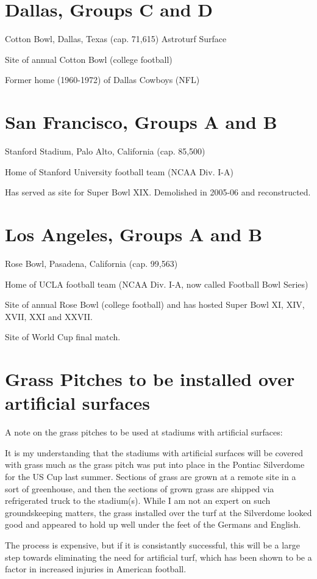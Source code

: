 \section{Dallas, Groups C and D}
Cotton Bowl, Dallas, Texas (cap. 71,615) Astroturf Surface

Site of annual Cotton Bowl (college football)

Former home (1960-1972) of Dallas Cowboys (NFL)
\section{San Francisco, Groups A and B} 
Stanford Stadium, Palo Alto, California (cap. 85,500)

Home of Stanford University football team (NCAA Div. I-A)
 
Has served as site for Super Bowl XIX.  Demolished in 2005-06 and reconstructed.
\section{Los Angeles, Groups A and B} 
Rose Bowl, Pasadena, California (cap. 99,563)

Home of UCLA football team (NCAA Div. I-A, now called Football Bowl Series)

Site of annual Rose Bowl (college football) and has hosted Super Bowl XI, XIV, XVII, XXI and XXVII.

Site of World Cup final match.
\section{Grass Pitches to be installed over artificial surfaces}
A note on the grass pitches to be used at stadiums with artificial surfaces:

It is my understanding that the stadiums with artificial surfaces will be 
covered with grass much as the grass pitch was put into place in the Pontiac 
Silverdome for the US Cup last summer.  Sections of grass are grown at a remote
site in a sort of greenhouse, and then the sections of grown grass are shipped
via refrigerated truck to the stadium(s).  While I am not an expert on such 
groundskeeping matters, the grass installed over the turf at the Silverdome 
looked good and appeared to hold up well under the feet of the Germans and 
English.  

The process is expensive, but if it is consistantly successful, this will be a
large step towards eliminating the need for artificial turf, which has been 
shown to be a factor in increased injuries in American football.

